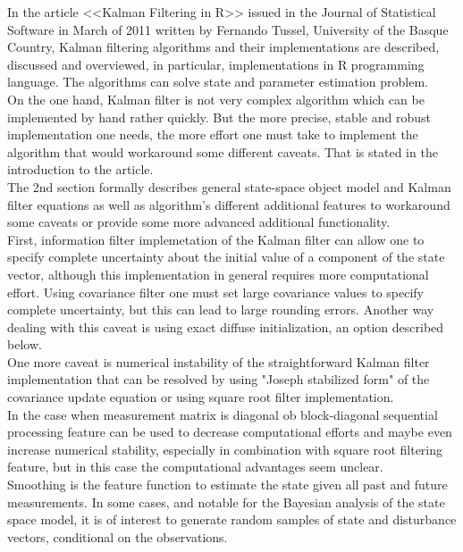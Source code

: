 \documentclass[a4paper,14pt]{extarticle}
\begin{document}
In the article <<Kalman Filtering in R>> issued in the Journal of Statistical
Software in March of 2011 written by Fernando Tussel, University of the
Basque Country, Kalman filtering algorithms and their implementations are
described, discussed and overviewed, in particular, implementations in R
programming language. The algorithms can solve state and parameter estimation
problem. \\

On the one hand, Kalman filter is not very complex algorithm which can be
implemented by hand rather quickly. But the more precise, stable and robust
implementation one needs, the more effort one must take to implement the
algorithm that would workaround some different caveats. That is stated in the
introduction to the article. \\

The 2nd section formally describes general state-space object model and Kalman
filter equations as well as algorithm's different additional features to
workaround some caveats or provide some more advanced additional
functionality. \\

First, information filter implemetation of the Kalman filter
can allow one to specify complete uncertainty about the initial value of a 
component of the state vector, although this implementation in general
requires more computational effort. Using covariance filter one must set 
large covariance values to specify complete uncertainty, but this can lead
to large rounding errors. Another way dealing with this caveat is using
exact diffuse initialization, an option described below. \\

One more caveat is numerical instability of the straightforward Kalman filter
implementation that can be resolved by using "Joseph stabilized form" of the
covariance update equation or using square root filter implementation. \\

In the case when measurement matrix is diagonal ob block-diagonal
sequential processing feature can be used to decrease computational efforts and
maybe even increase numerical stability, especially in combination with square
root filtering feature, but in this case the computational advantages seem
unclear. \\

Smoothing is the feature function to estimate the state given all past and
future measurements. In some cases, and notable for the Bayesian analysis of
the state space model, it is of interest to generate random samples of state
and disturbance vectors, conditional on the observations. \\
\end{document}
